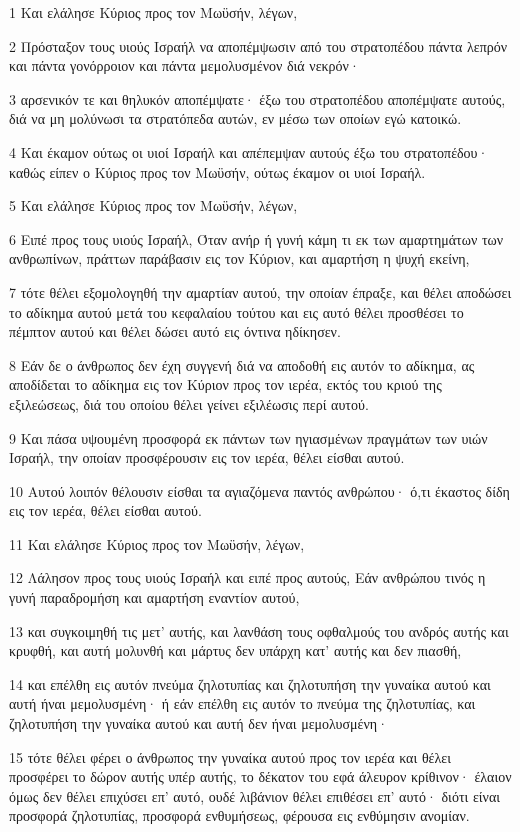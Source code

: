\par 1 Και ελάλησε Κύριος προς τον Μωϋσήν, λέγων,
\par 2 Πρόσταξον τους υιούς Ισραήλ να αποπέμψωσιν από του στρατοπέδου πάντα λεπρόν και πάντα γονόρροιον και πάντα μεμολυσμένον διά νεκρόν·
\par 3 αρσενικόν τε και θηλυκόν αποπέμψατε· έξω του στρατοπέδου αποπέμψατε αυτούς, διά να μη μολύνωσι τα στρατόπεδα αυτών, εν μέσω των οποίων εγώ κατοικώ.
\par 4 Και έκαμον ούτως οι υιοί Ισραήλ και απέπεμψαν αυτούς έξω του στρατοπέδου· καθώς είπεν ο Κύριος προς τον Μωϋσήν, ούτως έκαμον οι υιοί Ισραήλ.
\par 5 Και ελάλησε Κύριος προς τον Μωϋσήν, λέγων,
\par 6 Ειπέ προς τους υιούς Ισραήλ, Όταν ανήρ ή γυνή κάμη τι εκ των αμαρτημάτων των ανθρωπίνων, πράττων παράβασιν εις τον Κύριον, και αμαρτήση η ψυχή εκείνη,
\par 7 τότε θέλει εξομολογηθή την αμαρτίαν αυτού, την οποίαν έπραξε, και θέλει αποδώσει το αδίκημα αυτού μετά του κεφαλαίου τούτου και εις αυτό θέλει προσθέσει το πέμπτον αυτού και θέλει δώσει αυτό εις όντινα ηδίκησεν.
\par 8 Εάν δε ο άνθρωπος δεν έχη συγγενή διά να αποδοθή εις αυτόν το αδίκημα, ας αποδίδεται το αδίκημα εις τον Κύριον προς τον ιερέα, εκτός του κριού της εξιλεώσεως, διά του οποίου θέλει γείνει εξιλέωσις περί αυτού.
\par 9 Και πάσα υψουμένη προσφορά εκ πάντων των ηγιασμένων πραγμάτων των υιών Ισραήλ, την οποίαν προσφέρουσιν εις τον ιερέα, θέλει είσθαι αυτού.
\par 10 Αυτού λοιπόν θέλουσιν είσθαι τα αγιαζόμενα παντός ανθρώπου· ό,τι έκαστος δίδη εις τον ιερέα, θέλει είσθαι αυτού.
\par 11 Και ελάλησε Κύριος προς τον Μωϋσήν, λέγων,
\par 12 Λάλησον προς τους υιούς Ισραήλ και ειπέ προς αυτούς, Εάν ανθρώπου τινός η γυνή παραδρομήση και αμαρτήση εναντίον αυτού,
\par 13 και συγκοιμηθή τις μετ' αυτής, και λανθάση τους οφθαλμούς του ανδρός αυτής και κρυφθή, και αυτή μολυνθή και μάρτυς δεν υπάρχη κατ' αυτής και δεν πιασθή,
\par 14 και επέλθη εις αυτόν πνεύμα ζηλοτυπίας και ζηλοτυπήση την γυναίκα αυτού και αυτή ήναι μεμολυσμένη· ή εάν επέλθη εις αυτόν το πνεύμα της ζηλοτυπίας, και ζηλοτυπήση την γυναίκα αυτού και αυτή δεν ήναι μεμολυσμένη·
\par 15 τότε θέλει φέρει ο άνθρωπος την γυναίκα αυτού προς τον ιερέα και θέλει προσφέρει το δώρον αυτής υπέρ αυτής, το δέκατον του εφά άλευρον κρίθινον· έλαιον όμως δεν θέλει επιχύσει επ' αυτό, ουδέ λιβάνιον θέλει επιθέσει επ' αυτό· διότι είναι προσφορά ζηλοτυπίας, προσφορά ενθυμήσεως, φέρουσα εις ενθύμησιν ανομίαν.
